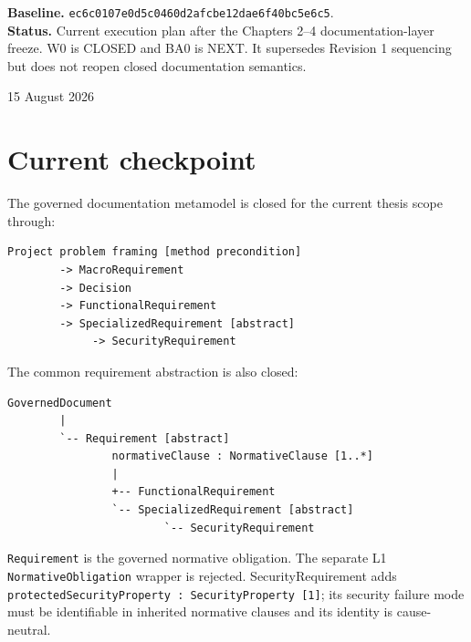 \documentclass[11pt,a4paper]{article}
\begin{document}
\begin{titlepage}\centering\vspace*{2cm}{\Large Documentation-Driven Threat Analysis\par}\vspace{0.8cm}{\Huge\bfseries Research Work Plan\par}\vspace{0.3cm}{\LARGE After documentation-layer closure -- Revision 2\par}\vspace{1cm}{\large From the frozen documentation metamodel to Base Analysis, BAE and multi-method analysis\par}\vfill\begin{minipage}{0.84\textwidth}\small
\textbf{Baseline.} \texttt{ec6c0107e0d5c0460d2afcbe12dae6f40bc5e6c5}.\\[0.5em]
\textbf{Status.} Current execution plan after the Chapters 2--4 documentation-layer freeze. W0 is CLOSED and BA0 is NEXT. It supersedes Revision 1 sequencing but does not reopen closed documentation semantics.\end{minipage}\vfill{\large 15 August 2026\par}\end{titlepage}
\tableofcontents\newpage
\section{Current checkpoint}
The governed documentation metamodel is closed for the current thesis scope through:
\begin{lstlisting}
Project problem framing [method precondition]
        -> MacroRequirement
        -> Decision
        -> FunctionalRequirement
        -> SpecializedRequirement [abstract]
             -> SecurityRequirement
\end{lstlisting}
The common requirement abstraction is also closed:
\begin{lstlisting}
GovernedDocument
        |
        `-- Requirement [abstract]
                normativeClause : NormativeClause [1..*]
                |
                +-- FunctionalRequirement
                `-- SpecializedRequirement [abstract]
                        `-- SecurityRequirement
\end{lstlisting}
\texttt{Requirement} is the governed normative obligation. The separate L1 \texttt{NormativeObligation} wrapper is rejected. SecurityRequirement adds \texttt{protectedSecurityProperty : SecurityProperty [1]}; its security failure mode must be identifiable in inherited normative clauses and its identity is cause-neutral.
\end{document}

